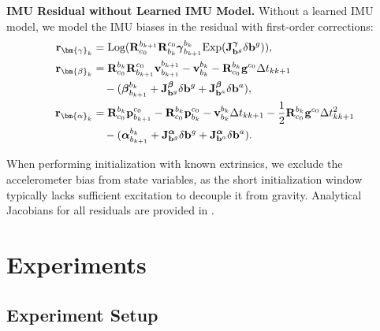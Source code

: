 \noindent \textbf{IMU Residual without Learned IMU Model.} Without a learned IMU model, we model the IMU biases in the residual with first-order corrections:
\begin{align}
\label{eq:maci2:inte_res_r_2}
\mathbf{r}_{\bm{\gamma}_k} &= \text{Log} (\mathbf{R}^{b_{k+1}}_{c_0} \mathbf{R}^{c_0}_{b_k}\boldsymbol{\gamma}_{b_{k+1}}^{b_k} \text{Exp} ( \mathbf{J}^{\boldsymbol{\gamma}}_{\mathbf{b}^g} \delta \mathbf{b}^g)), \\
\mathbf{r}_{\bm{\beta}_k} &= \mathbf{R}^{b_k}_{c_0} \mathbf{R}^{c_0}_{b_{k+1}} \mathbf{v}_{b_{k+1}}^{b_{k+1}} - \mathbf{v}_{b_k}^{b_k} - \mathbf{R}^{b_k}_{c_0} \mathbf{g}^{c_0} \Delta t_{kk+1} \notag \\
& \quad - (\boldsymbol{\beta}_{b_{k+1}}^{b_k} + \mathbf{J}^{\boldsymbol{\beta}}_{\mathbf{b}^g} \delta \mathbf{b}^g + \mathbf{J}^{\boldsymbol{\beta}}_{\mathbf{b}^a} \delta \mathbf{b}^a),
\label{eq:maci2:inte_res_v_2}
\\
\mathbf{r}_{\bm{\alpha}_k} &= \mathbf{R}^{b_k}_{c_0} \mathbf{p}_{b_{k+1}}^{c_0} - \mathbf{R}^{b_k}_{c_0} \mathbf{p}_{b_k}^{c_0} - \mathbf{v}_{b_k}^{b_k}\Delta t_{kk+1} - \frac{1}{2}\mathbf{R}^{b_k}_{c_0}\mathbf{g}^{c_0}\Delta t_{kk+1}^2 \notag \\
& \quad - (\boldsymbol{\alpha}_{b_{k+1}}^{b_k} + \mathbf{J}^{\boldsymbol{\alpha}}_{\mathbf{b}^g} 
\delta \mathbf{b}^g + \mathbf{J}^{\boldsymbol{\alpha}}_{\mathbf{b}^a} \delta \mathbf{b}^a).
\label{eq:maci2:inte_res_p_2}
\end{align}

When performing initialization with known extrinsics, we exclude the accelerometer bias from state variables, as the short initialization window typically lacks sufficient excitation to decouple it from gravity. Analytical Jacobians for all residuals are provided in .


\section{Experiments}
\label{sec:maci2:experiments}

\subsection{Experiment Setup}
\label{sec:maci2:setup}




